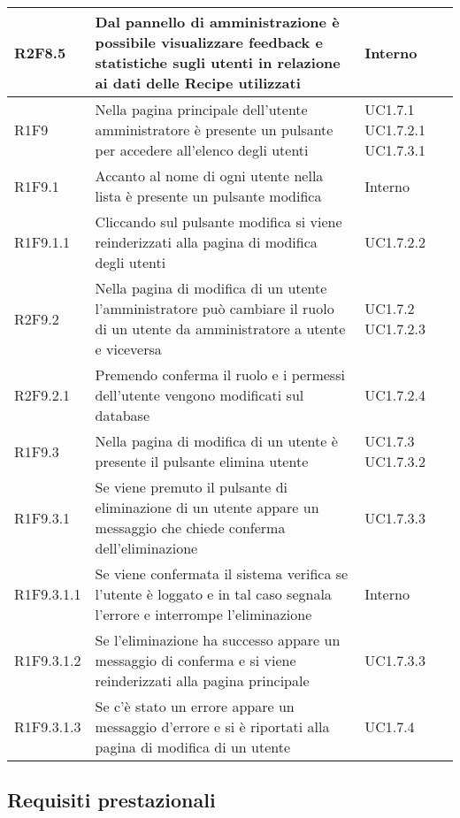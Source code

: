 \begin{center}
\begin{longtable}{| p{2cm} | p{8cm} | p{2cm} |}
		R2F8.5  &  Dal pannello di amministrazione è possibile visualizzare feedback e statistiche sugli utenti in relazione ai dati delle Recipe utilizzati  &  Interno \\
		\hline
		R1F9 & Nella pagina principale dell'utente amministratore è presente un pulsante per accedere all'elenco degli utenti  &  UC1.7.1 \newline UC1.7.2.1 \newline UC1.7.3.1 \\
		\hline
		R1F9.1  &  Accanto al nome di ogni utente nella lista è presente un pulsante modifica  &  Interno \\
		\hline
		R1F9.1.1  &  Cliccando sul pulsante modifica si viene reinderizzati alla pagina di modifica degli utenti  &  UC1.7.2.2 \\
		\hline
		R2F9.2  &  Nella pagina di modifica di un utente l'amministratore può cambiare il ruolo di un utente da amministratore a utente e viceversa  &  UC1.7.2 \newline UC1.7.2.3 \\
		\hline
		R2F9.2.1  &  Premendo conferma il ruolo e i permessi dell'utente vengono modificati sul database  &  UC1.7.2.4 \\
		\hline
		R1F9.3  &  Nella pagina di modifica di un utente è presente il pulsante elimina utente  &  UC1.7.3 \newline UC1.7.3.2 \\
		\hline
		R1F9.3.1  &  Se viene premuto il pulsante di eliminazione di un utente appare un messaggio che chiede conferma dell'eliminazione  & UC1.7.3.3\\
		\hline
		R1F9.3.1.1  &  Se viene confermata il sistema verifica se l'utente è loggato e in tal caso segnala l'errore e interrompe l'eliminazione  & Interno \\
		\hline
		R1F9.3.1.2  &  Se l'eliminazione ha successo appare un messaggio di conferma e si viene reinderizzati alla pagina principale  & UC1.7.3.3\\
		\hline
		R1F9.3.1.3  &  Se c'è stato un errore appare un messaggio d'errore e si è riportati alla pagina di modifica di un utente  & UC1.7.4\\
		\hline

	\end{longtable}
	\egroup
\end{center}


\subsection{Requisiti prestazionali}

